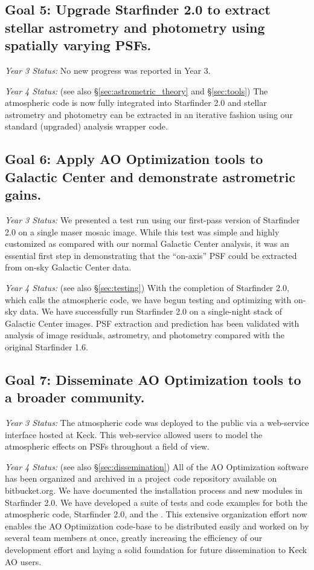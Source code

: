 \subsection{Goal 5: Upgrade Starfinder 2.0 to extract stellar astrometry and
  photometry using spatially varying PSFs.}

\noindent
\textit{Year 3 Status:}
No new progress was reported in Year 3.

\noindent
\textit{Year 4 Status:}
(see also \S\ref{sec:astrometric_theory} and \S\ref{sec:tools})
The atmospheric code is now fully integrated into Starfinder 2.0 and
stellar astrometry and photometry can be extracted in an iterative
fashion using our standard
(upgraded) analysis wrapper code. 


\subsection{Goal 6: Apply AO Optimization tools to Galactic Center and demonstrate
  astrometric gains.}

\noindent
\textit{Year 3 Status:}
We presented a test run using our first-pass version of Starfinder
2.0 on a single maser mosaic image. While this test was simple and highly
customized as compared with our normal Galactic Center
analysis, it was an essential first step in demonstrating that the
``on-axis'' PSF could be extracted from on-sky Galactic Center data.
 
\noindent
\textit{Year 4 Status:}
(see also \S\ref{sec:testing})
With the completion of Starfinder 2.0, which calls the atmospheric
code, we have begun testing and optimizing with on-sky data. We have
successfully run Starfinder 2.0 on a single-night stack of Galactic
Center images. PSF extraction and prediction has been validated
with analysis of image residuals, astrometry, and photometry compared
with the original Starfinder 1.6. 


\subsection{Goal 7: Disseminate AO Optimization tools to a broader community.}

\noindent
\textit{Year 3 Status:}
The atmospheric code was deployed to the public via a web-service
interface hosted at Keck. This web-service allowed users to model
the atmospheric effects on PSFs throughout a field of view. 

\noindent
\textit{Year 4 Status:}
(see also \S\ref{sec:dissemination})
All of the AO Optimization software has been organized and archived in
a project code repository available on bitbucket.org. We have
documented the installation process and new modules in Starfinder
2.0. We have developed a suite of tests and code examples for both the
atmospheric code, Starfinder 2.0, and the . This extensive
organization effort now enables the AO Optimization code-base to be
distributed easily and worked on by several team members at once,
greatly increasing the efficiency of our development effort and laying
a solid foundation for future dissemination to Keck AO users.


  
  
  
  
